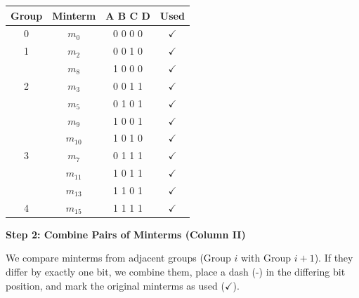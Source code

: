 \documentclass[12pt,a3paper]{article}
\begin{document}
\begin{enumerate}
\begin{tcolorbox}[enhanced,breakable,ansbox,colback=cC!4,colframe=cC,boxrule=0.8pt,arc=5pt,title={\textbf{Answer}},fonttitle=\bfseries\color{white},colbacktitle=cC]
\begin{center}
\begin{tabular}{cccc}
\toprule
\textbf{Group} & \textbf{Minterm} & \textbf{A B C D} & \textbf{Used} \\
\midrule
0 & $m_0$ & 0 0 0 0 & $\checkmark$ \\
\midrule
1 & $m_2$ & 0 0 1 0 & $\checkmark$ \\
  & $m_8$ & 1 0 0 0 & $\checkmark$ \\
\midrule
2 & $m_3$ & 0 0 1 1 & $\checkmark$ \\
  & $m_5$ & 0 1 0 1 & $\checkmark$ \\
  & $m_9$ & 1 0 0 1 & $\checkmark$ \\
  & $m_{10}$ & 1 0 1 0 & $\checkmark$ \\
\midrule
3 & $m_7$ & 0 1 1 1 & $\checkmark$ \\
  & $m_{11}$ & 1 0 1 1 & $\checkmark$ \\
  & $m_{13}$ & 1 1 0 1 & $\checkmark$ \\
\midrule
4 & $m_{15}$ & 1 1 1 1 & $\checkmark$ \\
\bottomrule
\end{tabular}
\end{center}

\vspace{1em}
\textbf{\large Step 2: Combine Pairs of Minterms (Column II)}

We compare minterms from adjacent groups (Group $i$ with Group $i+1$). If they differ by exactly one bit, we combine them, place a dash (-) in the differing bit position, and mark the original minterms as used ($\checkmark$).


\end{tcolorbox}
\end{enumerate}
\end{document}
